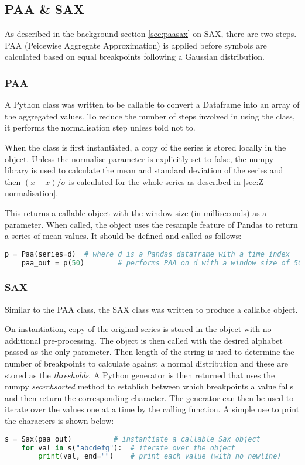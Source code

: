 \documentclass[../report.tex]{subfiles}
\begin{document}
\subsection{PAA \& SAX}
	As described in the background section \cref{sec:paasax} on SAX, there are two steps.  PAA (Peicewise Aggregate Approximation) is applied before symbols are calculated based on equal breakpoints following a Gaussian distribution.
	
\subsubsection{PAA}
	A Python class was written to be callable to convert a Dataframe into an array of the aggregated values.  To reduce the number of steps involved in using the class, it performs the normalisation step unless told not to.
	
	
	
	When the class is first instantiated, a copy of the series is stored locally in the object.  Unless the normalise parameter is explicitly set to false, the numpy library is used to calculate the mean and standard deviation of the series and then $(x - \bar{x}) / \sigma$ is calculated for the whole series as described in \cref{sec:Z-normalisation}.
	
	This returns a callable object with the window size (in milliseconds) as a parameter.  When called, the object uses the resample feature of Pandas to return a series of mean values.	It should be defined and called as follows:
	
\begin{lstlisting}[language=Python]
	p = Paa(series=d)  # where d is a Pandas dataframe with a time index
	paa_out = p(50)        # performs PAA on d with a window size of 50ms
\end{lstlisting}

\subsubsection{SAX}
	Similar to the PAA class, the SAX class was written to produce a callable object.

	
	
	On instantiation, copy of the original series is stored in the object with no additional pre-processing.  The object is then called with the desired alphabet passed as the only parameter.  Then length of the string is used to determine the number of breakpoints to calculate against a normal distribution and these are stored as the \textit{thresholds}.  A Python generator is then returned that uses the numpy \textit{searchsorted} method to establish between which breakpoints a value falls and then return the corresponding character.  The generator can then be used to iterate over the values one at a time by the calling function.  A simple use to print the characters is shown below:
	
\begin{lstlisting}[language=Python]
	s = Sax(paa_out)          # instantiate a callable Sax object
	for val in s("abcdefg"):  # iterate over the object
	    print(val, end="")    # print each value (with no newline)
\end{lstlisting}
	
\end{document}

